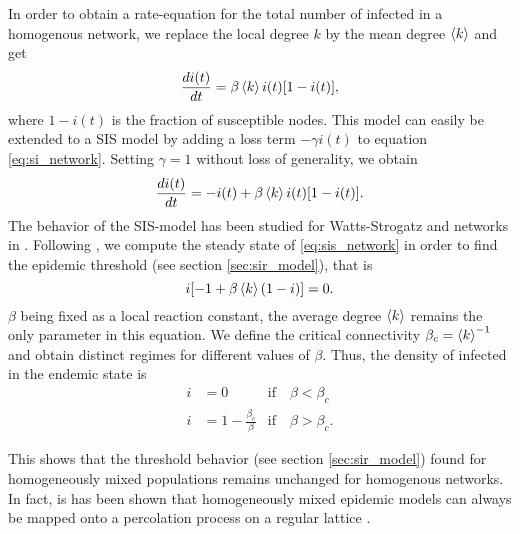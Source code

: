 In order to obtain a rate-equation for the total number of infected in a homogenous network, we replace the local degree $k$ by the mean degree $\left< k \right>$ and get
\begin{equation}\label{eq:si_network}
\frac{di(t)}{dt}=\beta \left< k \right> i(t) [1-i(t)],
\end{equation}
where $1-i(t)$ is the fraction of susceptible nodes.
This model can easily be extended to a SIS model by adding a loss term $-\gamma i(t)$ to equation \eqref{eq:si_network}.
Setting $\gamma =1 $ without loss of generality, we obtain 
\begin{equation}\label{eq:sis_network}
\frac{di(t)}{dt}=-i(t)+ \beta \left< k \right> i(t) [1-i(t)] .
\end{equation}
The behavior of the SIS-model has been studied for Watts-Strogatz and \BA networks in \citep{Pastor-Satorras_vespi:2001}.
Following \citeauthor{Pastor-Satorras_vespi:2001}, we compute the steady state of \eqref{eq:sis_network} in order to find the epidemic threshold (see section \ref{sec:sir_model}), that is
\[
i[-1+\beta \left< k \right> (1-i)]=0.
\]
$\beta $ being fixed as a local reaction constant, the average degree $\left< k \right>$ remains the only parameter in this equation.
We define the critical connectivity $\beta _c=\left< k \right>^{-1}$ and obtain distinct regimes for different values of $\beta $.
Thus, the density of infected in the endemic state is
\begin{align}\label{eq:endemic_ws}
i&=0   &\text{if} \quad \beta < \beta _c \nonumber \\
i &=1-\frac{\beta _c}{\beta }  &\text{if} \quad \beta > \beta _c .
\end{align}

This shows that the threshold behavior (see section \ref{sec:sir_model}) found for homogeneously mixed populations remains unchanged for homogenous networks.
In fact, is has been shown that homogeneously mixed epidemic models can always be mapped onto a percolation process on a regular lattice   \citep{Grassberger1983157,Sander2002293}.

